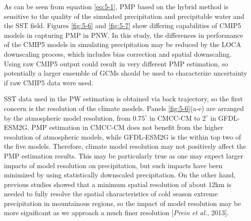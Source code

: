 As can be seen from equation \ref{eq:5-1}, PMP based on the hybrid method is sensitive to the quality of the simulated precipitation and precipitable water and the SST field. Figures \ref{fig:5-6} and \ref{fig:5-7} show differing capabilities of CMIP5 models in capturing PMP in PNW. In this study, the differences in performance of the CMIP5 models in simulating precipitation may be reduced by the LOCA downscaling process, which includes bias correction and spatial downscaling. Using raw CMIP5 output could result in very different PMP estimation, so potentially a larger ensemble of GCMs should be used to characterize uncertainty if raw CMIP5 data were used.

SST data used in the PW estimation is obtained via back trajectory, so the first concern is the resolution of the climate models. Panels \ref{fig:5-6}(a-e) are arranged by the atmospheric model resolution, from $0.75^{\circ}$ in CMCC-CM to $2^{\circ}$ in GFDL-ESM2G. PMP estimation in CMCC-CM does not benefit from the higher resolution of atmospheric models, while GFDL-ESM2G is the within top two of the five models. Therefore, climate model resolution may not positively affect the PMP estimation results. This may be particularly true as one may expect larger impacts of model resolution on precipitation, but such impacts have been minimized by using statistically downscaled precipitation. On the other hand, previous studies showed that a minimum spatial resolution of about 12km is needed to fully resolve the spatial characteristics of cold season extreme precipitation in mountainous regions, so the impact of model resolution may be more significant as we approach a much finer resolution [\textit{Prein et al.}, 2013].

